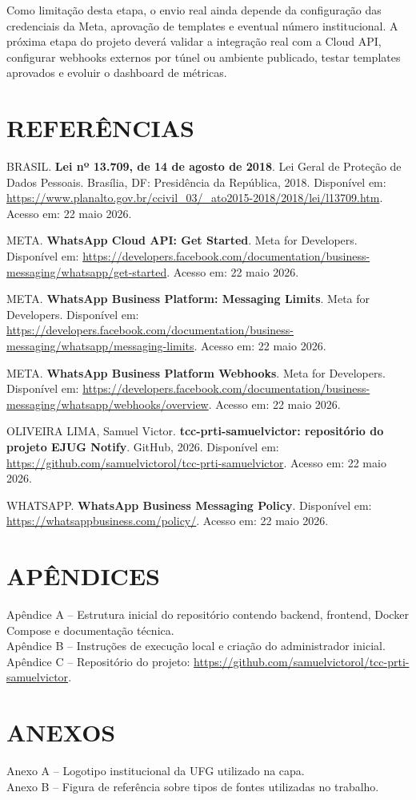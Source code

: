 \documentclass[12pt,letterpaper,oneside]{report}
\newcommand{\RepositorioProjeto}{https://github.com/samuelvictorol/tcc-prti-samuelvictor}
\begin{document}
Como limitação desta etapa, o envio real ainda depende da configuração das credenciais da Meta, aprovação de templates e eventual número institucional. A próxima etapa do projeto deverá validar a integração real com a Cloud API, configurar webhooks externos por túnel ou ambiente publicado, testar templates aprovados e evoluir o dashboard de métricas.

\chapter*{REFERÊNCIAS}

BRASIL. \textbf{Lei nº 13.709, de 14 de agosto de 2018}. Lei Geral de Proteção de Dados Pessoais. Brasília, DF: Presidência da República, 2018. Disponível em: \url{https://www.planalto.gov.br/ccivil_03/_ato2015-2018/2018/lei/l13709.htm}. Acesso em: 22 maio 2026.

META. \textbf{WhatsApp Cloud API: Get Started}. Meta for Developers. Disponível em: \url{https://developers.facebook.com/documentation/business-messaging/whatsapp/get-started}. Acesso em: 22 maio 2026.

META. \textbf{WhatsApp Business Platform: Messaging Limits}. Meta for Developers. Disponível em: \url{https://developers.facebook.com/documentation/business-messaging/whatsapp/messaging-limits}. Acesso em: 22 maio 2026.

META. \textbf{WhatsApp Business Platform Webhooks}. Meta for Developers. Disponível em: \url{https://developers.facebook.com/documentation/business-messaging/whatsapp/webhooks/overview}. Acesso em: 22 maio 2026.

OLIVEIRA LIMA, Samuel Victor. \textbf{tcc-prti-samuelvictor: repositório do projeto EJUG Notify}. GitHub, 2026. Disponível em: \url{https://github.com/samuelvictorol/tcc-prti-samuelvictor}. Acesso em: 22 maio 2026.

WHATSAPP. \textbf{WhatsApp Business Messaging Policy}. Disponível em: \url{https://whatsappbusiness.com/policy/}. Acesso em: 22 maio 2026.

\clearpage
\chapter*{APÊNDICES}

Apêndice A -- Estrutura inicial do repositório contendo backend, frontend, Docker Compose e documentação técnica.\\
Apêndice B -- Instruções de execução local e criação do administrador inicial.\\
Apêndice C -- Repositório do projeto: \url{\RepositorioProjeto}.

\clearpage
\chapter*{ANEXOS}

Anexo A -- Logotipo institucional da UFG utilizado na capa.\\
Anexo B -- Figura de referência sobre tipos de fontes utilizadas no trabalho.
\end{document}
